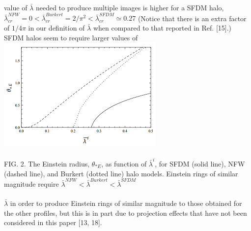 \documentclass{article}
\begin{document}
\begin{multicols}{2}[]
value of $\bar{\lambda}$ needed to produce multiple images is higher for
a SFDM halo, $\bar{\lambda}^{NFW}_{cr}=0<\bar{\lambda}^{Burkert}_{cr}=2/\pi^2<\bar{\lambda}^{SFDM}_{cr}\simeq0.27$
(Notice that there is an extra factor of $1/4\pi$ in
our definition of $\bar{\lambda}$ when compared to that reported in
Ref. [15].) SFDM halos seem to require larger values of
\includegraphics{img2.png}
\\\\FIG. 2. The Einstein radius, $\theta_{*E}$, as function of $\bar{\lambda}^i$, for
SFDM (solid line), NFW (dashed line), and Burkert (dotted
line) halo models. Einstein rings of similar magnitude require
$\bar{\lambda}^{NFW}<\bar{\lambda}^{Burkert}<\bar{\lambda}^{SFDM}$
\\\\$\bar{\lambda}$ in order to produce Einstein rings of similar magnitude
to those obtained for the other profiles, but this is in part
due to projection effects that have not been considered
in this paper [13, 18].

\begin{center}

\end{center}
\end{multicols}
\end{document}
